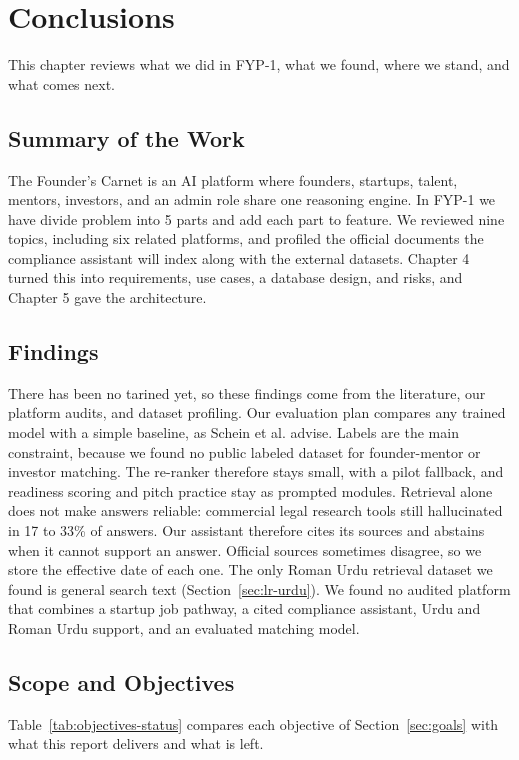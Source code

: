 \documentclass{FastFyp}
\begin{document}
\chapter{Conclusions}
This chapter reviews what we did in FYP-1, what we found, where we stand, and what comes next.

\section{Summary of the Work}
The Founder's Carnet is an AI platform where founders, startups, talent, mentors, investors, and an admin role share one reasoning engine. In FYP-1 we have divide problem into 5 parts and add each part to feature. We reviewed nine topics, including six related platforms, and profiled the official documents the compliance assistant will index along with the external datasets. Chapter 4 turned this into requirements, use cases, a database design, and risks, and Chapter 5 gave the architecture.

\section{Findings}
There has been no tarined yet, so these findings come from the literature, our platform audits, and dataset profiling. Our evaluation plan compares any trained model with a simple baseline, as Schein et al. advise. Labels are the main constraint, because we found no public labeled dataset for founder-mentor or investor matching. The re-ranker therefore stays small, with a pilot fallback, and readiness scoring and pitch practice stay as prompted modules. Retrieval alone does not make answers reliable: commercial legal research tools still hallucinated in 17 to 33\% of answers. Our assistant therefore cites its sources and abstains when it cannot support an answer. Official sources sometimes disagree, so we store the effective date of each one. The only Roman Urdu retrieval dataset we found is general search text (Section~\ref{sec:lr-urdu}). We found no audited platform that combines a startup job pathway, a cited compliance assistant, Urdu and Roman Urdu support, and an evaluated matching model.

\section{Scope and Objectives}
Table~\ref{tab:objectives-status} compares each objective of Section~\ref{sec:goals} with what this report delivers and what is left.
\end{document}
